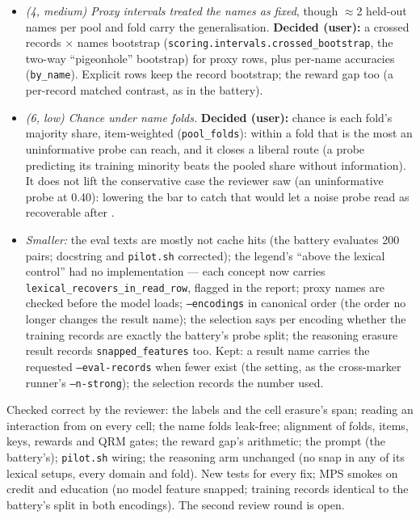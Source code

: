 \documentclass{article}
\begin{document}
\begin{itemize}
  \item \emph{(4, medium) Proxy intervals treated the names as fixed}, though $\approx$2 held-out names per pool and
        fold carry the generalisation. \textbf{Decided (user):} a crossed records $\times$ names bootstrap
        (\texttt{scoring.intervals.crossed\_bootstrap}, the two-way ``pigeonhole'' bootstrap) for proxy rows, plus
        per-name accuracies (\texttt{by\_name}). Explicit rows keep the record bootstrap; the reward gap too (a
        per-record matched contrast, as in the battery).
  \item \emph{(6, low) Chance under name folds.} \textbf{Decided (user):} chance is each fold's majority share,
        item-weighted (\texttt{pool\_folds}): within a fold that is the most an uninformative probe can reach, and it
        closes a liberal route (a probe predicting its training minority beats the pooled share without
        information). It does not lift the conservative case the reviewer saw (an uninformative probe at 0.40):
        lowering the bar to catch that would let a noise probe read as recoverable after \leace{}.
  \item \emph{Smaller:} the eval texts are mostly not cache hits (the battery evaluates 200 pairs; docstring and
        \texttt{pilot.sh} corrected); the legend's ``above the lexical control'' had no implementation --- each concept
        now carries \texttt{lexical\_recovers\_in\_read\_row}, flagged in the report; proxy names are checked before the
        model loads; \texttt{--encodings} in canonical order (the order no longer changes the result name); the
        selection says per encoding whether the training records are exactly the battery's probe split; the reasoning
        erasure result records \texttt{snapped\_features} too. Kept: a result name carries the requested
        \texttt{--eval-records} when fewer exist (the setting, as the cross-marker runner's \texttt{--n-strong});
        the selection records the number used.
\end{itemize}
Checked correct by the reviewer: the labels and the cell erasure's span; reading an interaction from \leace{} on every
cell; the name folds leak-free; alignment of folds, items, keys, rewards and QRM gates; the reward gap's arithmetic;
the prompt (the battery's); \texttt{pilot.sh} wiring; the reasoning arm unchanged (no snap in any of its lexical
setups, every domain and fold). New tests for every fix; MPS smokes on credit and education (no model feature
snapped; training records identical to the battery's split in both encodings). The second review round is open.
\end{document}
